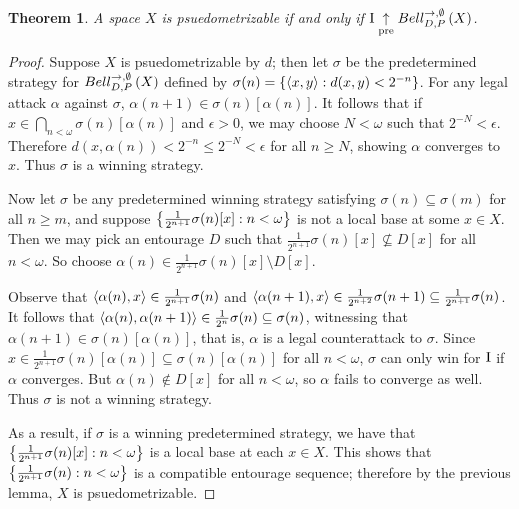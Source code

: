 \documentclass{amsart}
\newtheorem{theorem}{Theorem}[section]
\theoremstyle{definition}
\begin{document}
\begin{theorem}
A space \(X\) is psuedometrizable
if and only if 
\(\mathrm{I}\underset{\text{pre}}{\uparrow}Bell_{D,P}^{\to,\emptyset}\left({X}\right)\). 
\end{theorem}
\begin{proof}
Suppose \(X\) is psuedometrizable by \(d\);
then let \(\sigma\) be the predetermined strategy for \(Bell_{D,P}^{\to,\emptyset}\left({X}\right)\) defined by
\(\sigma(n)=\left\{\left\langle x,y\right\rangle:d(x,y)<2^{-n}\right\}\). 
For any legal attack \(\alpha\) against \(\sigma\), \(\alpha(n+1)\in\sigma(n)[\alpha(n)]\).
It follows that if \(x\in\bigcap_{n<\omega}\sigma(n)[\alpha(n)]\) and \(\epsilon>0\),
we may choose \(N<\omega\) such that \(2^{-N}<\epsilon\). Therefore 
\(d(x,\alpha(n))<2^{-n}\leq 2^{-N}<\epsilon\) for all \(n\geq N\), showing \(\alpha\) converges
to \(x\). Thus \(\sigma\) is a winning strategy.

Now let \(\sigma\) be any predetermined winning strategy satisfying \(\sigma(n)\subseteq\sigma(m)\)
for all \(n\geq m\), and suppose \(\left\{\frac{1}{2^{n+1}}\sigma(n)[x]:n<\omega\right\}\) is not a
local base at some \(x\in X\). Then we may pick an entourage \(D\) such that
\(\frac{1}{2^{n+1}}\sigma(n)[x]\not\subseteq D[x]\) for all \(n<\omega\). So choose
\(\alpha(n)\in\frac{1}{2^{n+1}}\sigma(n)[x]\setminus D[x]\).

Observe that \(\left\langle \alpha(n),x\right\rangle\in\frac{1}{2^{n+1}}\sigma(n)\) and
\(\left\langle \alpha(n+1),x\right\rangle\in\frac{1}{2^{n+2}}\sigma(n+1)\subseteq\frac{1}{2^{n+1}}\sigma(n)\).
It follows that \(\left\langle \alpha(n),\alpha(n+1)\right\rangle\in\frac{1}{2^n}\sigma(n)\subseteq\sigma(n)\),
witnessing that \(\alpha(n+1)\in\sigma(n)[\alpha(n)]\), that is, \(\alpha\) is a legal counterattack
to \(\sigma\). Since \(x\in\frac{1}{2^{n+1}}\sigma(n)[\alpha(n)]\subseteq\sigma(n)[\alpha(n)]\)
for all \(n<\omega\), \(\sigma\) can only win for \(\mathrm{I}\) if \(\alpha\) converges.
But \(\alpha(n)\not\in D[x]\) for all \(n<\omega\), so \(\alpha\) fails to converge as well.
Thus \(\sigma\) is not a winning strategy.

As a result, if \(\sigma\) is a winning predetermined strategy,
we have that \(\left\{\frac{1}{2^{n+1}}\sigma(n)[x]:n<\omega\right\}\) is a
local base at each \(x\in X\). 
This shows that \(\left\{\frac{1}{2^{n+1}}\sigma(n):n<\omega\right\}\)
is a compatible entourage sequence; therefore by the previous lemma,
\(X\) is psuedometrizable.
\end{proof}



\end{document}
